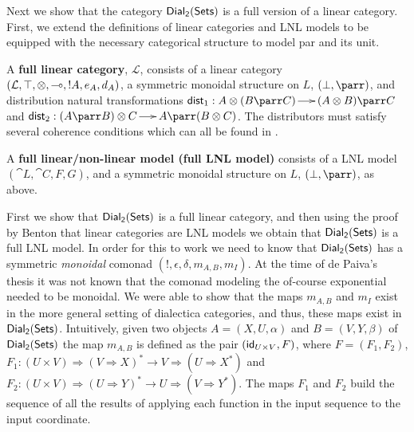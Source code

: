 Next we show that the category $\mathsf{Dial_2}(\mathsf{Sets})$ is a full version of a linear
category. First, we extend the definitions of linear categories and
LNL models to be equipped with the necessary categorical structure to
model par and its unit.
\begin{definition}
  \label{def:full-linear-cat}
  A \textbf{full linear category}, $\mathcal{L}$, consists of a linear
  category \\$(\mathcal{L}, \top, \otimes, \multimap,!A,e_A,d_A)$, a
  symmetric monoidal structure on $L$, $(\perp, \parr)$, and
  distribution natural transformations $\mathsf{dist}_1 : A \otimes (B
  \parr C) \to (A \otimes B) \parr C$ and $\mathsf{dist}_2 : (A \parr
  B) \otimes C \to A \parr (B \otimes C)$.  The distributors must
  satisfy several coherence conditions which can all be found in
  \cite{Cockett:1997}.
\end{definition}
\begin{definition}
  \label{def:full-lnl-model}
  A \textbf{full linear/non-linear model (full LNL model)} consists of
  a LNL model $(\cat{L}, \cat{C},F,G)$, and a symmetric monoidal
  structure on $L$, $(\perp, \parr)$, as above.
\end{definition}

\noindent
First we show that $\mathsf{Dial_2}(\mathsf{Sets})$ is a full linear category, and then using
the proof by Benton that linear categories are LNL models we obtain
that $\mathsf{Dial_2}(\mathsf{Sets})$ is a full LNL model. In order for this to work we
need to know that $\mathsf{Dial_2}(\mathsf{Sets})$ has a symmetric \textit{monoidal} comonad $(!,
\epsilon, \delta, m_{A,B}, m_I)$.  At the time of de Paiva's
thesis it was not known that the comonad modeling the of-course
exponential needed to be monoidal.  We were able to show that the maps
$m_{A,B}$ and $m_I$ exist in the more general setting of dialectica
categories, and thus, these maps exist in $\mathsf{Dial_2}(\mathsf{Sets})$. Intuitively, given
two objects $A = (X,U,\alpha)$ and $B = (V,Y,\beta)$ of $\mathsf{Dial_2}(\mathsf{Sets})$ the
map $m_{A,B}$ is defined as the pair $(\mathsf{id}_{U \times V},F)$, where $F
= (F_1,F_2)$, $F_1 : (U \times V) \Rightarrow (V \Rightarrow X)^* \to
V \Rightarrow (U \Rightarrow X^*)$ and $F_2 : (U \times V) \Rightarrow
(U \Rightarrow Y)^* \to U \Rightarrow (V \Rightarrow Y^*)$.  The maps
$F_1$ and $F_2$ build the sequence of all the results of applying each
function in the input sequence to the input coordinate.

